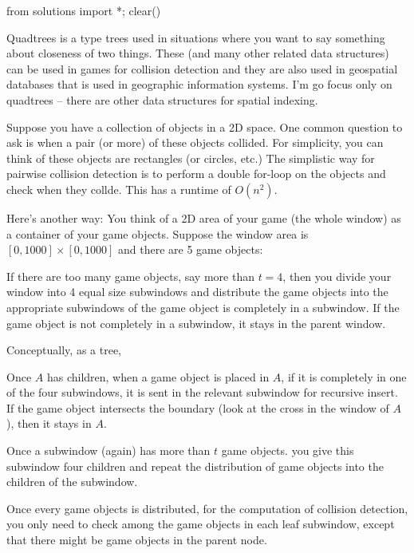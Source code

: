 
\begin{python0}
from solutions import *; clear()
\end{python0}

Quadtrees is a type trees used in
situations where you want to say something about closeness
of two things.
These (and many other related data structures) can be used
in games for collision detection
and they are also used in geospatial databases that is used
in geographic information systems.
I'm go focus only on quadtrees -- there are other
data structures for spatial indexing.

Suppose you have a collection of objects in a 2D space.
One common question to ask is when a pair (or more) of these
objects collided.
For simplicity, you can think of these objects are
rectangles (or circles, etc.)
The simplistic way for pairwise collision detection
is to perform a double for-loop on the objects
and check when they collde.
This has a runtime of $O(n^2)$.

Here's another way:
You think of a 2D area of your game (the whole window)
as a container of your game objects.
Suppose the window area is
$[0, 1000] \times [0, 1000]$
and there are 5 game objects:

If there are too many game objects, say more than
$t = 4$, then you divide your
window into 4 equal size subwindows and distribute the game objects
into the appropriate subwindows of the game object is completely in a
subwindow.
If the game object is not completely in a subwindow, it stays in the
parent window.


Conceptually, as a tree, 

Once $A$ has children, when a game object is placed in $A$,
if it is completely in one of the four subwindows, it is sent in  the
relevant subwindow for recursive insert.
If the game object intersects the boundary (look at the cross
in the window of $A$), then it stays in $A$.

Once a subwindow (again) has more than $t$ game objects.
you give this subwindow four children and repeat the distribution
of game objects into the children of the subwindow.

Once every game objects is distributed,
for the computation of collision detection,
you only need to check among the game objects in each leaf
subwindow, except that there might be game objects in the parent node.

